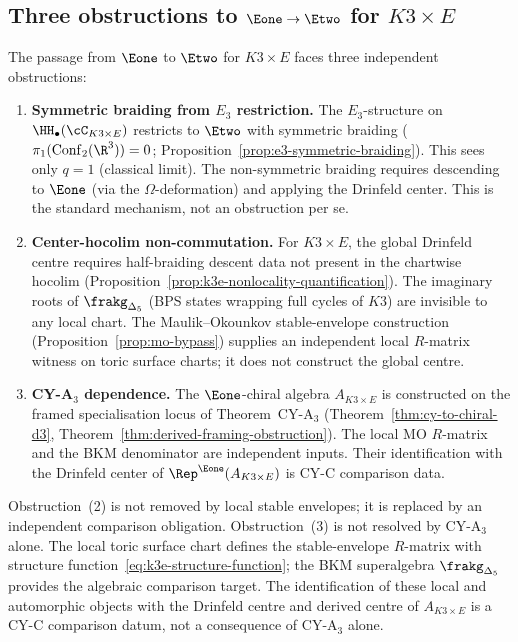 \subsection{Three obstructions to \texorpdfstring{$\Eone \to \Etwo$}{E1 -> E2} for \texorpdfstring{$K3 \times E$}{K3 x E}}
\label{subsec:three-obstructions-k3e}

\begin{remark}
\label{rem:three-obstructions-k3e}
The passage from $\Eone$ to $\Etwo$ for $K3 \times E$ faces
three independent obstructions:

\begin{enumerate}[label=\textup{(\arabic*)}]
 \item \textbf{Symmetric braiding from $E_3$ restriction.}
 The $E_3$-structure on $\HH_\bullet(\cC_{K3 \times E})$
 restricts to $\Etwo$ with symmetric braiding
 ($\pi_1(\mathrm{Conf}_2(\R^3)) = 0$; Proposition~\ref{prop:e3-symmetric-braiding}).
 This sees only $q = 1$ (classical limit). The non-symmetric
 braiding requires descending to $\Eone$ (via the
 $\Omega$-deformation) and applying the Drinfeld center.
 This is the standard mechanism, not an obstruction per se.

 \item \textbf{Center-hocolim non-commutation.}
 For \(K3 \times E\), the global Drinfeld centre requires
 half-braiding descent data not present in the chartwise hocolim
 (Proposition~\ref{prop:k3e-nonlocality-quantification}).
 The imaginary roots of $\frakg_{\Delta_5}$ (BPS states
 wrapping full cycles of $K3$) are invisible to any local
 chart. The Maulik--Okounkov stable-envelope construction
 (Proposition~\ref{prop:mo-bypass}) supplies an independent local
 \(R\)-matrix witness on toric surface charts; it does not construct
 the global centre.

 \item \textbf{CY-A$_3$ dependence.}
 The $\Eone$-chiral algebra \(A_{K3 \times E}\) is constructed on the
 framed specialisation locus of Theorem~CY-A$_3$
 (Theorem~\ref{thm:cy-to-chiral-d3},
 Theorem~\ref{thm:derived-framing-obstruction}).
 The local MO \(R\)-matrix and the BKM denominator are independent
 inputs. Their identification with the Drinfeld center of
 \(\Rep^{\Eone}(A_{K3 \times E})\) is CY-C comparison data.
\end{enumerate}

Obstruction~(2) is not removed by local stable envelopes; it is replaced
by an independent comparison obligation. Obstruction~(3) is not resolved
by CY-A$_3$ alone. The local toric surface chart defines the stable-envelope
\(R\)-matrix with structure function~\eqref{eq:k3e-structure-function};
the BKM superalgebra \(\frakg_{\Delta_5}\) provides the algebraic
comparison target. The identification of these local and automorphic
objects with the Drinfeld centre and derived centre of
\(A_{K3\times E}\) is a CY-C comparison datum, not a consequence of
CY-A$_3$ alone.
\end{remark}


